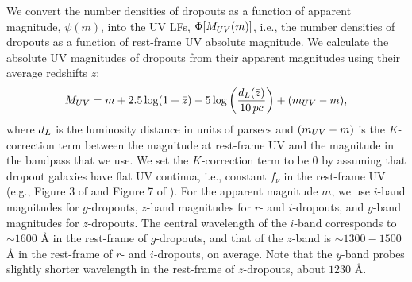 \documentclass[]{pasj01}
\begin{document}
We convert the number densities of dropouts as a function of apparent magnitude, $\psi(m)$, 
into the UV LFs, $\Phi[M_{\rm UV}(m)]$, i.e., the number densities of dropouts  
as a function of rest-frame UV absolute magnitude.
We calculate the absolute UV magnitudes of dropouts from their apparent magnitudes 
using their average redshifts $\bar z$:   
\begin{equation}
M_{\rm UV} 
= m + 2.5 \log(1+\bar z) - 5 \log \left( \frac{d_{\rm L}(\bar z) }{ 10 \, {\rm pc}} \right) + (m_{\rm UV} - m),  
\end{equation}
where $d_{\rm L}$ is the luminosity distance in units of parsecs 
and 
$(m_{\rm UV} - m)$ 
is the $K$-correction term 
between the magnitude at rest-frame UV 
and the magnitude in the bandpass that we use. 
We set the $K$-correction term to be $0$ 
by assuming that dropout galaxies have flat UV continua, i.e., constant $f_\nu$ in the rest-frame UV 
(e.g., Figure 3 of \cite{2006ApJ...642..653S} and 
Figure 7 of \cite{2010A&A...523A..74V}). 
For the apparent magnitude $m$, 
we use $i$-band magnitudes for $g$-dropouts, 
$z$-band magnitudes for $r$- and $i$-dropouts, 
and 
$y$-band magnitudes for $z$-dropouts. 
The central wavelength of the $i$-band 
corresponds to $\sim 1600$ {\AA} in the rest-frame of $g$-dropouts, 
and that of the $z$-band is $\sim 1300-1500$ {\AA} 
in the rest-frame of $r$- and $i$-dropouts, on average.   
Note that the $y$-band probes slightly shorter wavelength 
in the rest-frame of $z$-dropouts, 
about $1230$ {\AA}. 
\end{document}
